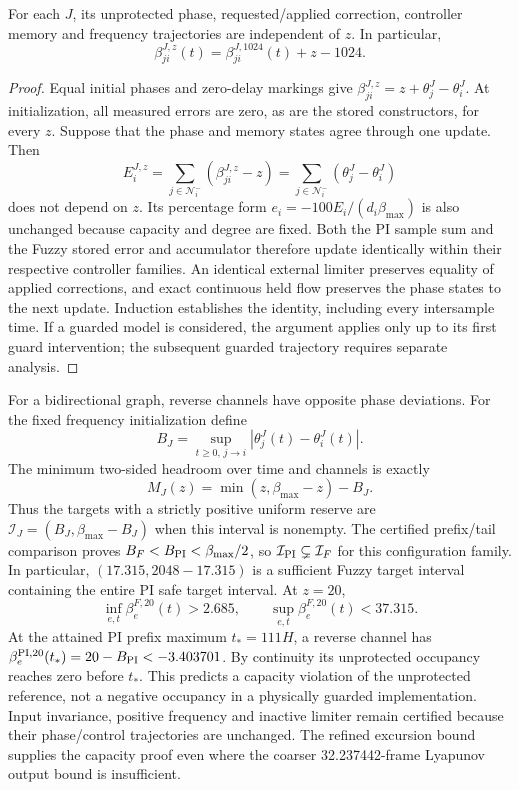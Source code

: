 \begin{btdlemma}
\label{detail:lem:btd_target_translation}
For each $J$, its unprotected phase, requested/applied correction,
controller memory and frequency trajectories are independent of $z$.
In particular,
\begin{equation}
 \beta_{ji}^{J,z}(t)=\beta_{ji}^{J,1024}(t)+z-1024.
 \label{detail:eq:btd_translation_identity}
\end{equation}
\end{btdlemma}
\begin{proof}
Equal initial phases and zero-delay markings give
$\beta_{ji}^{J,z}=z+\theta_j^J-\theta_i^J$.
At initialization, all measured errors are zero, as are the
stored constructors, for every $z$. Suppose that the phase and
memory states agree through one update. Then
\[
 E_i^{J,z}=\sum_{j\in\mathcal N_i^-}
 (\beta_{ji}^{J,z}-z)
 =\sum_{j\in\mathcal N_i^-}(\theta_j^J-\theta_i^J)
\]
does not depend on $z$. Its percentage form
$e_i=-100E_i/(d_i\beta_{\max})$ is also unchanged because capacity
and degree are fixed. Both the PI sample sum and
the Fuzzy stored error and accumulator therefore update identically
within their respective controller families. An identical external
limiter preserves equality of applied corrections, and exact
continuous held flow preserves the phase states to the next update.
Induction establishes the identity, including every intersample time.
If a guarded model is considered, the argument applies only up to
its first guard intervention; the subsequent guarded trajectory
requires separate analysis.
\end{proof}

For a bidirectional graph, reverse channels have opposite phase
deviations. For the fixed frequency initialization define
\[
 B_J=\sup_{t\ge0,\,j\to i}|\theta_j^J(t)-\theta_i^J(t)|.
\]
The minimum two-sided headroom over time and channels is exactly
\begin{equation}
 M_J(z)=\min(z,\beta_{\max}-z)-B_J.
 \label{detail:eq:btd_translated_headroom}
\end{equation}
Thus the targets with a strictly positive uniform reserve are
$\mathcal I_J=(B_J,\beta_{\max}-B_J)$ when this interval is nonempty.
The certified prefix/tail comparison proves $B_F<B_{\rm PI}<\beta_{\max}/2$,
so $\mathcal I_{\rm PI}\subsetneq\mathcal I_F$ for this configuration
family. In particular, $(17.315,2048-17.315)$ is a sufficient
Fuzzy target interval containing the entire PI safe target interval.
At $z=20$,
\[
 \inf_{e,t}\beta_e^{F,20}(t)>2.685,
 \qquad \sup_{e,t}\beta_e^{F,20}(t)<37.315.
\]
At the attained PI prefix maximum $t_*=111H$, a reverse channel has
$\beta_e^{\rm PI,20}(t_*)=20-B_{\rm PI}<-3.403701$.
By continuity its unprotected occupancy reaches zero before $t_*$.
This predicts a capacity violation of the unprotected reference,
not a negative occupancy in a physically guarded implementation.
Input invariance, positive frequency and inactive limiter remain
certified because their phase/control trajectories are unchanged.
The refined excursion bound supplies the capacity proof even where
the coarser 32.237442-frame Lyapunov output bound is insufficient.


